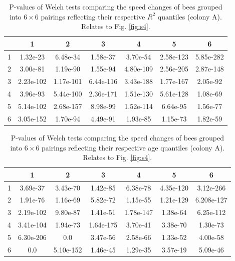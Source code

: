 \documentclass{article}
\begin{document}
\begin{table}[h!]
\centering
\def\tablename{Supplementary Table}
\caption{
P-values of Welch tests comparing the speed changes of bees grouped into $6 \times 6$ pairings reflecting their respective $R^2$ quantiles (colony A). Relates to Fig. \ref{fig:s4}.
}
\begin{tabular}{|c|c|c|c|c|c|c|}
\hline
 & 1 & 2 & 3 & 4 & 5 & 6 \\ \hline
1 & 1.32e-23 & 6.48e-34 & 1.58e-37 & 3.70e-54 & 2.58e-123 & 5.85e-282 \\ \hline
2 & 3.00e-81 & 1.19e-90 & 1.55e-94 & 4.80e-109 & 2.56e-205 & 2.87e-148 \\ \hline
3 & 2.23e-102 & 1.17e-101 & 6.44e-116 & 3.43e-188 & 1.77e-167 & 2.05e-92 \\ \hline
4 & 3.96e-93 & 5.44e-100 & 2.36e-171 & 1.51e-130 & 5.61e-128 & 1.08e-69 \\ \hline
5 & 5.14e-102 & 2.68e-157 & 8.98e-99 & 1.52e-114 & 6.64e-95 & 1.56e-77 \\ \hline
6 & 3.05e-152 & 1.70e-94 & 4.49e-91 & 1.93e-85 & 1.15e-73 & 1.82e-59 \\ \hline
\end{tabular}
\end{table}


\begin{table}[h!]
\centering
\def\tablename{Supplementary Table}
\caption{
P-values of Welch tests comparing the speed changes of bees grouped into $6 \times 6$ pairings reflecting their respective age quantiles (colony A). Relates to Fig. \ref{fig:s4}.
}
\begin{tabular}{|c|c|c|c|c|c|c|}
\hline
 & 1 & 2 & 3 & 4 & 5 & 6 \\ \hline
1 & 3.69e-37 & 3.43e-70 & 1.42e-85 & 6.38e-78 & 4.35e-120 & 3.12e-266 \\ \hline
2 & 1.91e-76 & 1.16e-69 & 5.82e-72 & 1.15e-55 & 1.21e-129 & 6.208e-127 \\ \hline
3 & 2.19e-102 & 9.80e-87 & 1.41e-51 & 1.78e-147 & 1.38e-64 & 6.25e-112 \\ \hline
4 & 3.41e-104 & 1.94e-73 & 1.64e-175 & 3.70e-41 & 3.38e-70 & 1.30e-73 \\ \hline
5 & 6.30e-206 & 0.0 & 3.47e-56 & 2.58e-66 & 1.33e-52 & 4.00e-58 \\ \hline
6 & 0.0 & 5.10e-152 & 1.46e-45 & 1.29e-35 & 3.57e-19 & 5.09e-46 \\ \hline
\end{tabular}
\end{table}
\end{document}
